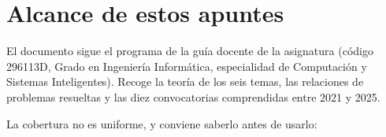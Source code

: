 \documentclass[12pt]{book} %
\begin{document}
\newpage
\thispagestyle{empty}
\mbox{}

\newpage
\thispagestyle{empty}
\mbox{}






\tableofcontents
\clearpage
\thispagestyle{empty} %

%
%

\hypertarget{alcance-de-estos-apuntes}{%
\chapter{Alcance de estos apuntes}\label{alcance-de-estos-apuntes}}

El documento sigue el programa de la guía docente de la asignatura
(código 296113D, Grado en Ingeniería Informática, especialidad de
Computación y Sistemas Inteligentes). Recoge la teoría de los seis
temas, las relaciones de problemas resueltas y las diez convocatorias
comprendidas entre 2021 y 2025.

La cobertura no es uniforme, y conviene saberlo antes de usarlo:
\end{document}
